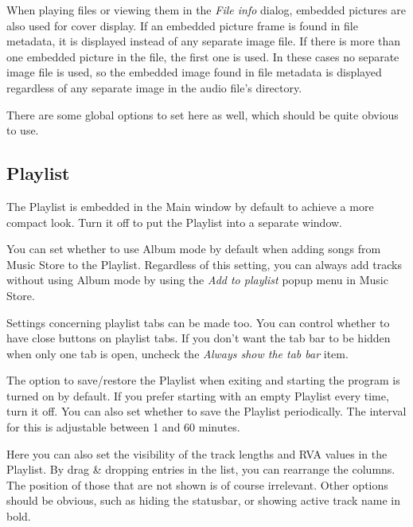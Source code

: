 \documentclass[10pt,english]{article}
\begin{document}
When playing files or viewing them in the \textsl{File
info} dialog, embedded pictures are also used for cover
display. If an embedded picture frame is found in file
metadata, it is displayed instead of any separate image
file. If there is more than one embedded picture in the file,
the first one is used. In these cases no separate image file
is used, so the embedded image found in file metadata is
displayed regardless of any separate image in the audio file's
directory.




There are some global options to set here as well, which
should be quite obvious to use.






\subsection{Playlist\label{idp853680}}



\noindent The Playlist is embedded in the Main window by default to
achieve a more compact look. Turn it off to put the Playlist
into a separate window.




You can set whether to use Album mode by default when
adding songs from Music Store to the Playlist. Regardless of
this setting, you can always add tracks without using Album
mode by using the \textsl{Add to playlist} popup menu in
Music Store.




Settings concerning playlist tabs can be made too. You can
control whether to have close buttons on playlist tabs. If
you don't want the tab bar to be hidden when only one tab is
open, uncheck the \textsl{Always show the tab bar} item.




The option to save/restore the Playlist when exiting and
starting the program is turned on by default. If you prefer
starting with an empty Playlist every time, turn it off. You
can also set whether to save the Playlist periodically. The
interval for this is adjustable between 1 and 60 minutes.




Here you can also set the visibility of the track lengths
and RVA values in the Playlist. By drag \& dropping entries
in the list, you can rearrange the columns. The position of
those that are not shown is of course irrelevant. Other
options should be obvious, such as hiding the statusbar, or
showing active track name in bold.
\end{document}
